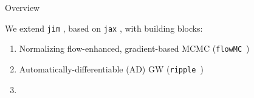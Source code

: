 \begin{frame}{Overview}

    \def\x{2mm}
  
  We extend \texttt{jim} \cite{wong2023fast}, based on \texttt{jax} \cite{jax2018github}, with building blocks:
  \vspace{2mm}
  \begin{enumerate}
    
  
    \item Normalizing flow-enhanced, gradient-based MCMC (\texttt{flowMC}~\cite{gabrie2021efficient, wong2022flowmc})
    
    \vspace{\x}
  
    \item Automatically-differentiable (AD) GW (\texttt{ripple}~\cite{edwards2023ripple})
    
    \vspace{\x}
  
    \item {}
  \end{enumerate}
  
  \vspace{-3mm}
  
    
  \end{frame}
  
  
  
  
  
  
      

